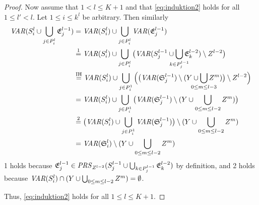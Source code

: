\begin{proof}
Now assume that $1<l\leq K+1$ and that \eqref{eq:induktion2} holds for all $1\leq l'< l$. Let $1\leq i \leq k^l$ be arbitrary.
Then similarly
\begin{align*}
\VAR(S^l_i \cup\bigcup_{j\in P^l_i}\mathfrak{E}^{l-1}_j) 
& = \VAR(S^l_i) \cup\bigcup_{j\in P^l_i}\VAR(\mathfrak{E}^{l-1}_j) \\
& \overset{1}= \VAR(S^l_i) \cup\bigcup_{j\in P^l_i}\big(\VAR(S^{l-1}_j\cup\smashoperator{\bigcup_{k\in P^{l-1}_j}}\mathfrak{E}^{l-2}_k)\setminus Z^{l-2}\big)\\
& \overset{\text{IH}}= \VAR(S^l_i) \cup\bigcup_{j\in P^1_i}\Big(\big(\VAR(\mathfrak{S}^{l-1}_j)\setminus (Y\cup\smashoperator{\bigcup_{0\leq m\leq l-3}}Z^m)\big)\setminus Z^{l-2}\Big)\\  
& = \VAR(S^l_i) \cup\bigcup_{j\in P^1_i}\big(\VAR(\mathfrak{S}^{l-1}_j)\setminus (Y\cup\bigcup_{0\leq m\leq l-2}Z^m)\big)\\  
& \overset{2}= \big(\VAR(S^l_i) \cup\bigcup_{j\in P^1_i}\VAR(\mathfrak{S}^{l-1}_j)\big)\setminus (Y\cup\bigcup_{0\leq m\leq l-2}Z^m)\\  
& = \VAR(\mathfrak{S}^l_i)\setminus (Y\cup\bigcup_{0\leq m\leq l-2}Z^m) 
\end{align*}
1 holds because $\mathfrak{E}^{l-1}_j\in \mathit{PRS}_{Z^{l-2}}(S^{l-1}_j\cup\bigcup_{k\in P^{l-1}_j}\mathfrak{E}^{l-2}_k)$ by definition, and 2 holds because $\mathit{VAR}(S^l_i)\cap (Y\cup\bigcup_{0\leq m\leq l-2}Z^m)=\emptyset$.

Thus, \eqref{eq:induktion2} holds for all $1\leq l \leq K+1$.
\end{proof}

